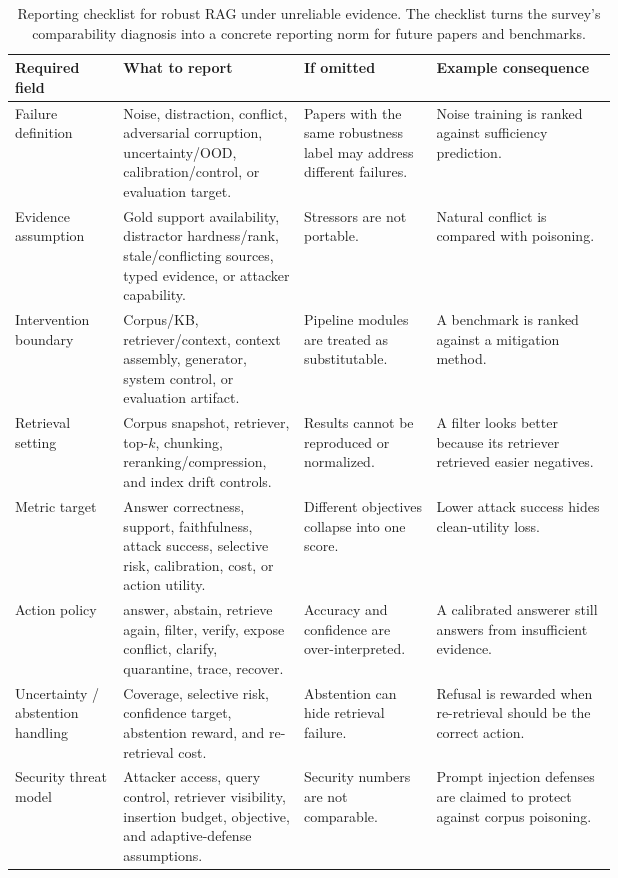 \documentclass[11pt]{article}
\begin{document}
\begin{table}[t]
\centering
\scriptsize
\renewcommand{\arraystretch}{0.9}
\begin{tabularx}{\linewidth}{>{\raggedright\arraybackslash}p{0.18\linewidth}>{\raggedright\arraybackslash}p{0.30\linewidth}>{\raggedright\arraybackslash}p{0.22\linewidth}X}
\toprule
\textbf{Required field} & \textbf{What to report} & \textbf{If omitted} & \textbf{Example consequence} \\
\midrule
Failure definition & Noise, distraction, conflict, adversarial corruption, uncertainty/OOD, calibration/control, or evaluation target. & Papers with the same robustness label may address different failures. & Noise training is ranked against sufficiency prediction. \\
Evidence assumption & Gold support availability, distractor hardness/rank, stale/conflicting sources, typed evidence, or attacker capability. & Stressors are not portable. & Natural conflict is compared with poisoning. \\
Intervention boundary & Corpus/KB, retriever/context, context assembly, generator, system control, or evaluation artifact. & Pipeline modules are treated as substitutable. & A benchmark is ranked against a mitigation method. \\
Retrieval setting & Corpus snapshot, retriever, top-$k$, chunking, reranking/compression, and index drift controls. & Results cannot be reproduced or normalized. & A filter looks better because its retriever retrieved easier negatives. \\
Metric target & Answer correctness, support, faithfulness, attack success, selective risk, calibration, cost, or action utility. & Different objectives collapse into one score. & Lower attack success hides clean-utility loss. \\
Action policy & answer, abstain, retrieve again, filter, verify, expose conflict, clarify, quarantine, trace, recover. & Accuracy and confidence are over-interpreted. & A calibrated answerer still answers from insufficient evidence. \\
Uncertainty / abstention handling & Coverage, selective risk, confidence target, abstention reward, and re-retrieval cost. & Abstention can hide retrieval failure. & Refusal is rewarded when re-retrieval should be the correct action. \\
Security threat model & Attacker access, query control, retriever visibility, insertion budget, objective, and adaptive-defense assumptions. & Security numbers are not comparable. & Prompt injection defenses are claimed to protect against corpus poisoning. \\
\bottomrule
\end{tabularx}
\caption{Reporting checklist for robust RAG under unreliable evidence. The checklist turns the survey's comparability diagnosis into a concrete reporting norm for future papers and benchmarks.}
\label{tab:robust-rag-reporting-checklist}
\end{table}
\end{document}
